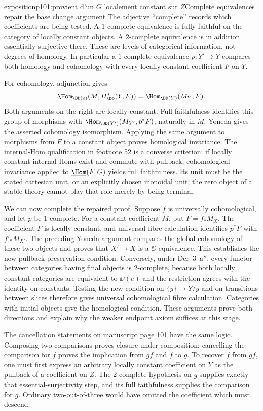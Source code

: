 \begin{dcomment}{exposition}{p101:provient d’un $G$ localement constant sur $Z$}{Complete equivalences repair the base change argument}
The adjective ``complete'' records which coefficients are being tested. A $1$-complete equivalence is fully faithful on the category of locally constant objects. A $2$-complete equivalence is in addition essentially surjective there. These are levels of categorical information, not degrees of homology. In particular a $1$-complete equivalence $p:Y'\to Y$ compares both homology and cohomology with every locally constant coefficient $F$ on $Y$.

For cohomology, adjunction gives
\[
 \Hom_{\DD(e)}(M,H^*_{\DD}(Y,F))
       =\Hom_{\DD(Y)}(M_Y,F).
\]
Both arguments on the right are locally constant. Full faithfulness identifies this group of morphisms with $\Hom_{\DD(Y')}(M_{Y'},p^*F)$, naturally in $M$. Yoneda gives the asserted cohomology isomorphism. Applying the same argument to morphisms from $F$ to a constant object proves homological invariance. The internal-Hom qualification in footnote 52 is a converse criterion: if locally constant internal Homs exist and commute with pullback, cohomological invariance applied to $\underline{\Hom}(F,G)$ yields full faithfulness. Its unit must be the stated cartesian unit, or an explicitly chosen monoidal unit; the zero object of a stable theory cannot play that role merely by being terminal.

We can now complete the repaired proof. Suppose $f$ is universally cohomological, and let $p$ be $1$-complete. For a constant coefficient $M$, put $F=f_*M_X$. The coefficient $F$ is locally constant, and universal fibre calculation identifies $p^*F$ with $f'_*M_{X'}$. The preceding Yoneda argument compares the global cohomology of these two objects and proves that $X'\to X$ is a $\DD$-equivalence. This establishes the new pullback-preservation condition. Conversely, under Der~3~a$''$, every functor between categories having final objects is $2$-complete, because both locally constant categories are equivalent to $\DD(e)$ and the restriction agrees with the identity on constants. Testing the new condition on $\{y\}\to Y/y$ and on transitions between slices therefore gives universal cohomological fibre calculation. Categories with initial objects give the homological condition. These arguments prove both directions and explain why the weaker endpoint axiom suffices at this stage.

The cancellation statements on manuscript page 101 have the same logic. Composing two comparisons proves closure under composition; cancelling the comparison for $f$ proves the implication from $gf$ and $f$ to $g$. To recover $f$ from $gf$, one must first express an arbitrary locally constant coefficient on $Y$ as the pullback of a coefficient on $Z$. The $2$-complete hypothesis on $g$ supplies exactly that essential-surjectivity step, and its full faithfulness supplies the comparison for $g$. Ordinary two-out-of-three would have omitted the coefficient which must descend.
\end{dcomment}

